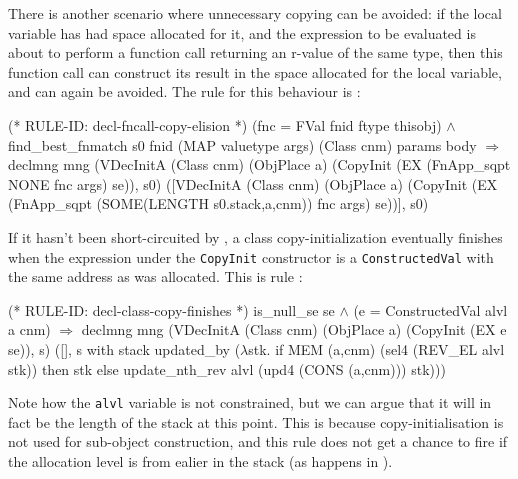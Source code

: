 \documentclass[11pt]{article}
\begin{document}
There is another scenario where unnecessary copying can be avoided: if
the local variable has had space allocated for it, and the expression
to be evaluated is about to perform a function call returning an
r-value of the same type, then this function call can construct its
result in the space allocated for the local variable, and
 can again be avoided.  The rule for this
behaviour is :
\begin{stdrule}
(* RULE-ID: decl-fncall-copy-elision *)
     (fnc = FVal fnid ftype thisobj) \(\land\)
     find_best_fnmatch s0 fnid (MAP valuetype args)
                       (Class cnm) params body
   \(\Rightarrow\)
     declmng mng
       (VDecInitA (Class cnm) (ObjPlace a)
                  (CopyInit (EX (FnApp_sqpt NONE fnc args) se)),
        s0)
       ([VDecInitA
           (Class cnm) (ObjPlace a)
           (CopyInit
              (EX (FnApp_sqpt (SOME(LENGTH s0.stack,a,cnm))
                              fnc
                              args)
                  se))],
        s0)
\end{stdrule}
If it hasn't been short-circuited by
, a class copy-initialization
eventually finishes when the expression under the \texttt{CopyInit}
constructor is a \texttt{ConstructedVal} with the same address as was
allocated.  This is rule :%
%
\begin{stdrule}
(* RULE-ID: decl-class-copy-finishes *)
     is_null_se se \(\land\)
     (e = ConstructedVal alvl a cnm)
   \(\Rightarrow\)
     declmng mng
       (VDecInitA (Class cnm) (ObjPlace a)
                  (CopyInit (EX e se)), s)
       ([],
        s with stack updated_by
          (\(\lambda\)stk.
             if MEM (a,cnm) (sel4 (REV_EL alvl stk)) then stk
             else
               update_nth_rev alvl (upd4 (CONS (a,cnm))) stk)))
\end{stdrule}
Note how the \texttt{alvl} variable is not constrained, but we can
argue that it will in fact be the length of the stack at this point.
This is because copy-initialisation is not used for sub-object
construction, and this rule does not get a chance to fire if the
allocation level is from ealier in the stack (as happens in
).

\end{document}
